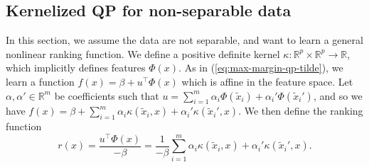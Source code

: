 \documentclass{article}
\newcommand{\RR}{\mathbb R}
\begin{document}
\subsection{Kernelized QP for non-separable data}
\label{sec:kernelized-qp}
In this section, we assume the data are not separable, and want to
learn a general nonlinear ranking function. We define a positive
definite kernel $\kappa:\RR^p\times \RR^p\rightarrow\RR$, which
implicitly defines features $\Phi(x)$. As in
(\ref{eq:max-margin-qp-tilde}), we learn a function $f(x)=\beta +
u^\intercal \Phi(x)$ which is affine in the feature space. Let
$\alpha,\alpha'\in\RR^m$ be coefficients such that $u=\sum_{i=1}^m
\alpha_i \Phi(\tilde x_i) + \alpha_i' \Phi(\tilde x_i')$, and so we
have
 $f(x) =\beta + \sum_{i=1}^m \alpha_i \kappa(\tilde x_i, x) +
\alpha_i' \kappa(\tilde x_i', x)$. We then 
define the ranking function
\begin{equation}
  \label{eq:kernelized_r}
  r(x)= \frac{u^\intercal \Phi(x)}{-\beta} = \frac{1}{-\beta}
  \sum_{i=1}^m
    \alpha_i \kappa(\tilde x_i, x) + \alpha_i'  \kappa(\tilde x_i', x).
\end{equation}
\end{document}
